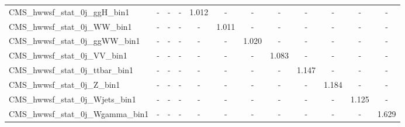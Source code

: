 \begin{table}[!ht]
\begin{center}
{\begin{tabular}{l|c|c|c|c|c|c|c|c|c|c|c|}
CMS\_hwwsf\_stat\_0j\_ggH\_bin1      &    -   &   -   &   -   & 1.012 &   -   &   -   &   -   &   -   &   -   &   -   &   -   \\ 
CMS\_hwwsf\_stat\_0j\_WW\_bin1       &    -   &   -   &   -   &   -   & 1.011 &   -   &   -   &   -   &   -   &   -   &   -   \\ 
CMS\_hwwsf\_stat\_0j\_ggWW\_bin1     &    -   &   -   &   -   &   -   &   -   & 1.020 &   -   &   -   &   -   &   -   &   -   \\ 
CMS\_hwwsf\_stat\_0j\_VV\_bin1       &    -   &   -   &   -   &   -   &   -   &   -   & 1.083 &   -   &   -   &   -   &   -   \\ 
CMS\_hwwsf\_stat\_0j\_ttbar\_bin1    &    -   &   -   &   -   &   -   &   -   &   -   &   -   & 1.147 &   -   &   -   &   -   \\ 
CMS\_hwwsf\_stat\_0j\_Z\_bin1        &    -   &   -   &   -   &   -   &   -   &   -   &   -   &   -   & 1.184 &   -   &   -   \\ 
CMS\_hwwsf\_stat\_0j\_Wjets\_bin1    &    -   &   -   &   -   &   -   &   -   &   -   &   -   &   -   &   -   & 1.125 &   -   \\ 
CMS\_hwwsf\_stat\_0j\_Wgamma\_bin1   &    -   &   -   &   -   &   -   &   -   &   -   &   -   &   -   &   -   &   -   & 1.629 \\ 
\hline
\end{tabular}
}
\end{center}
\end{table}


